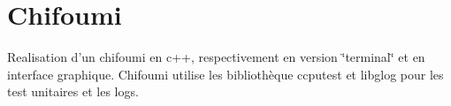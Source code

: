 \hypertarget{index_intro_sec}{}\section{Chifoumi}\label{index_intro_sec}
Realisation d'un chifoumi en c++, respectivement en version \char`\"{}terminal\char`\"{} et en interface graphique. Chifoumi utilise les bibliothèque ccputest et libglog pour les test unitaires et les logs. 